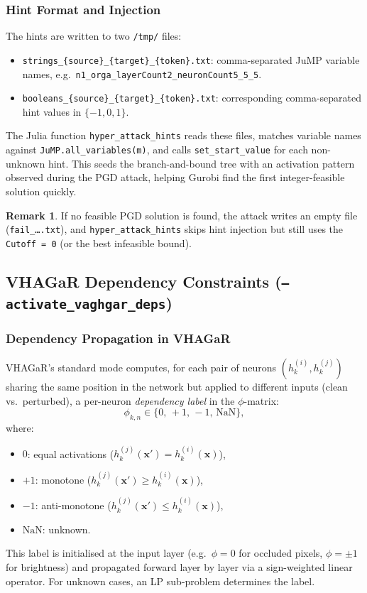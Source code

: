 \documentclass[11pt,a4paper]{article}
\theoremstyle{definition}
\newtheorem{remark}{Remark}[section]
\theoremstyle{plain}
\newcommand{\vx}{\mathbf{x}}
\newcommand{\vxp}{\mathbf{x}'}
\begin{document}
\subsubsection{Hint Format and Injection}

The hints are written to two \texttt{/tmp/} files:
\begin{itemize}
  \item \texttt{strings\_\{source\}\_\{target\}\_\{token\}.txt}: comma-separated JuMP variable names, e.g.\ \texttt{n1\_orga\_layerCount2\_neuronCount5\_5\_5}.
  \item \texttt{booleans\_\{source\}\_\{target\}\_\{token\}.txt}: corresponding comma-separated hint values in $\{-1, 0, 1\}$.
\end{itemize}
The Julia function \texttt{hyper\_attack\_hints} reads these files, matches variable names against \texttt{JuMP.all\_variables(m)}, and calls \texttt{set\_start\_value} for each non-unknown hint. This seeds the branch-and-bound tree with an activation pattern observed during the PGD attack, helping Gurobi find the first integer-feasible solution quickly.

\begin{remark}
If no feasible PGD solution is found, the attack writes an empty file (\texttt{fail\_\ldots.txt}), and \texttt{hyper\_attack\_hints} skips hint injection but still uses the \texttt{Cutoff = 0} (or the best infeasible bound).
\end{remark}

\subsection{VHAGaR Dependency Constraints (\texttt{--activate\_vaghgar\_deps})}
\label{sec:vaghgar_deps}

\subsubsection{Dependency Propagation in VHAGaR}

VHAGaR's standard mode computes, for each pair of neurons $(h_k^{(i)}, h_k^{(j)})$ sharing the same position in the network but applied to different inputs (clean vs.\ perturbed), a per-neuron \emph{dependency label} in the $\phi$-matrix:
\[
  \phi_{k,n} \in \{0,\, +1,\, -1,\, \mathrm{NaN}\},
\]
where:
\begin{itemize}
  \item $0$: equal activations ($h_k^{(j)}(\vxp) = h_k^{(i)}(\vx)$),
  \item $+1$: monotone ($h_k^{(j)}(\vxp) \ge h_k^{(i)}(\vx)$),
  \item $-1$: anti-monotone ($h_k^{(j)}(\vxp) \le h_k^{(i)}(\vx)$),
  \item $\mathrm{NaN}$: unknown.
\end{itemize}
This label is initialised at the input layer (e.g.\ $\phi = 0$ for occluded pixels, $\phi = \pm 1$ for brightness) and propagated forward layer by layer via a sign-weighted linear operator. For unknown cases, an LP sub-problem determines the label.
\end{document}
